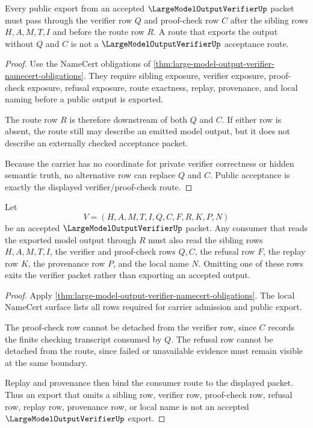 \begin{theorem}
\label{thm:large-model-output-verifier-public-acceptance-boundary}
Every public export from an accepted $\LargeModelOutputVerifierUp$ packet must pass through the verifier row $Q$ and proof-check row $C$ after the sibling rows $H,A,M,T,I$ and before the route row $R$. A route that exports the output without $Q$ and $C$ is not a $\LargeModelOutputVerifierUp$ acceptance route.
\end{theorem}
\begin{proof}
Use the NameCert obligations of \autoref{thm:large-model-output-verifier-namecert-obligations}. They require sibling exposure, verifier exposure, proof-check exposure, refusal exposure, route exactness, replay, provenance, and local naming before a public output is exported.

The route row $R$ is therefore downstream of both $Q$ and $C$. If either row is absent, the route still may describe an emitted model output, but it does not describe an externally checked acceptance packet.

Because the carrier has no coordinate for private verifier correctness or hidden semantic truth, no alternative row can replace $Q$ and $C$. Public acceptance is exactly the displayed verifier/proof-check route.
\end{proof}

\begin{theorem}
\label{thm:large-model-output-verifier-ledger-nonescape}
Let
$$
V=(H,A,M,T,I,Q,C,F,R,K,P,N)
$$
be an accepted $\LargeModelOutputVerifierUp$ packet. Any consumer that reads the exported model output through $R$ must also read the sibling rows $H,A,M,T,I$, the verifier and proof-check rows $Q,C$, the refusal row $F$, the replay row $K$, the provenance row $P$, and the local name $N$. Omitting one of these rows exits the verifier packet rather than exporting an accepted output.
\end{theorem}
\begin{proof}
Apply \autoref{thm:large-model-output-verifier-namecert-obligations}. The local NameCert surface lists all rows required for carrier admission and public export.

The proof-check row cannot be detached from the verifier row, since $C$ records the finite checking transcript consumed by $Q$. The refusal row cannot be detached from the route, since failed or unavailable evidence must remain visible at the same boundary.

Replay and provenance then bind the consumer route to the displayed packet. Thus an export that omits a sibling row, verifier row, proof-check row, refusal row, replay row, provenance row, or local name is not an accepted $\LargeModelOutputVerifierUp$ export.
\end{proof}

